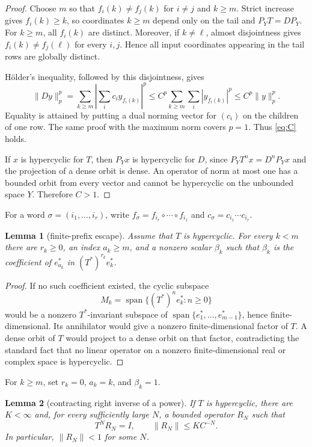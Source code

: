 \documentclass[11pt]{article}
\newtheorem{lemma}{Lemma}
\newcommand{\spn}{\operatorname{span}}
\begin{document}
\begin{proof}
Choose $m$ so that $f_i(k)\ne f_j(k)$ for $i\ne j$ and $k\ge m$.
Strict increase gives $f_i(k)\ge k$, so coordinates $k\ge m$ depend only on
the tail and $P_YT=DP_Y$.  For $k\ge m$, all $f_i(k)$ are distinct.  Moreover,
if $k\ne \ell$, almost disjointness gives
$f_i(k)\ne f_j(\ell)$ for every $i,j$.  Hence all input coordinates appearing
in the tail rows are globally distinct.

Hölder's inequality, followed by this disjointness, gives
\[
 \|Dy\|_p^p
 =\sum_{k\ge m}\left|\sum_i c_i y_{f_i(k)}\right|^p
 \le C^p\sum_{k\ge m}\sum_i|y_{f_i(k)}|^p
 \le C^p\|y\|_p^p.
\]
Equality is attained by putting a dual norming vector for $(c_i)$ on the
children of one row.  The same proof with the maximum norm covers $p=1$.
Thus \eqref{eq:C} holds.

If $x$ is hypercyclic for $T$, then $P_Yx$ is hypercyclic for $D$, since
$P_YT^nx=D^nP_Yx$ and the projection of a dense orbit is dense.  An operator
of norm at most one has a bounded orbit from every vector and cannot be
hypercyclic on the unbounded space $Y$.  Therefore $C>1$.
\end{proof}

For a word $\sigma=(i_1,\ldots,i_r)$, write
$f_\sigma=f_{i_r}\circ\cdots\circ f_{i_1}$ and
$c_\sigma=c_{i_1}\cdots c_{i_r}$.

\begin{lemma}[finite-prefix escape]\label{lem:escape}
Assume that $T$ is hypercyclic.  For every $k<m$ there are $r_k\ge0$, an
index $a_k\ge m$, and a nonzero scalar $\beta_k$ such that $\beta_k$ is the
coefficient of $e_{a_k}^*$ in $(T^*)^{r_k}e_k^*$.
\end{lemma}

\begin{proof}
If no such coefficient existed, the cyclic subspace
\[
 M_k=\spn\{(T^*)^ne_k^*:n\ge0\}
\]
would be a nonzero $T^*$-invariant subspace of
$\spn\{e_1^*,\ldots,e_{m-1}^*\}$, hence finite-dimensional.  Its annihilator
would give a nonzero finite-dimensional factor of $T$.  A dense orbit of $T$
would project to a dense orbit on that factor, contradicting the standard
fact that no linear operator on a nonzero finite-dimensional real or complex
space is hypercyclic.
\end{proof}

For $k\ge m$, set $r_k=0$, $a_k=k$, and $\beta_k=1$.

\begin{lemma}[contracting right inverse of a power]\label{lem:right}
If $T$ is hypercyclic, there are $K<\infty$ and, for every sufficiently large
$N$, a bounded operator $R_N$ such that
\[
                  T^NR_N=I,
       \qquad \|R_N\|\le K C^{-N}.
\tag{3}\label{eq:right}
\]
In particular, $\|R_N\|<1$ for some $N$.
\end{lemma}
\end{document}
